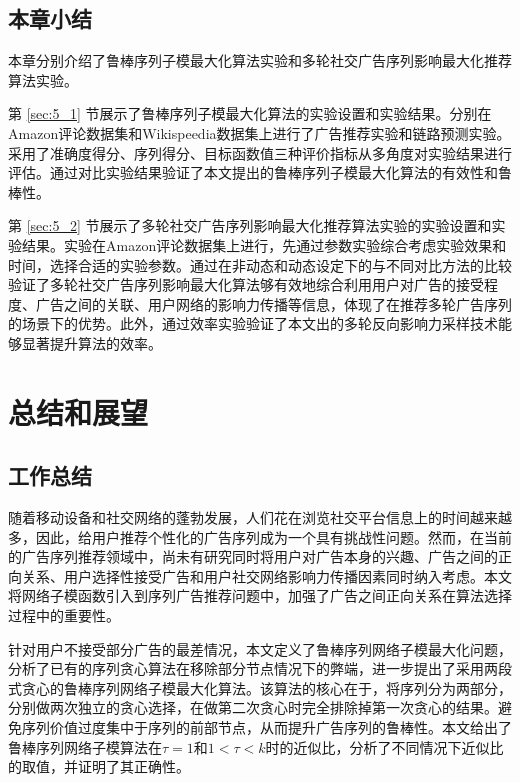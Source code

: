 \section{本章小结}

本章分别介绍了鲁棒序列子模最大化算法实验和多轮社交广告序列影响最大化推荐算法实验。

第 \ref{sec:5_1} 节展示了鲁棒序列子模最大化算法的实验设置和实验结果。分别在Amazon评论数据集和Wikispeedia数据集上进行了广告推荐实验和链路预测实验。采用了准确度得分、序列得分、目标函数值三种评价指标从多角度对实验结果进行评估。通过对比实验结果验证了本文提出的鲁棒序列子模最大化算法的有效性和鲁棒性。

第 \ref{sec:5_2} 节展示了多轮社交广告序列影响最大化推荐算法实验的实验设置和实验结果。实验在Amazon评论数据集上进行，先通过参数实验综合考虑实验效果和时间，选择合适的实验参数。通过在非动态和动态设定下的与不同对比方法的比较验证了多轮社交广告序列影响最大化算法够有效地综合利用用户对广告的接受程度、广告之间的关联、用户网络的影响力传播等信息，体现了在推荐多轮广告序列的场景下的优势。此外，通过效率实验验证了本文出的多轮反向影响力采样技术能够显著提升算法的效率。

\chapter{总结和展望}

\section{工作总结}

随着移动设备和社交网络的蓬勃发展，人们花在浏览社交平台信息上的时间越来越多，因此，给用户推荐个性化的广告序列成为一个具有挑战性问题。然而，在当前的广告序列推荐领域中，尚未有研究同时将用户对广告本身的兴趣、广告之间的正向关系、用户选择性接受广告和用户社交网络影响力传播因素同时纳入考虑。本文将网络子模函数引入到序列广告推荐问题中，加强了广告之间正向关系在算法选择过程中的重要性。

针对用户不接受部分广告的最差情况，本文定义了鲁棒序列网络子模最大化问题，分析了已有的序列贪心算法在移除部分节点情况下的弊端，进一步提出了采用两段式贪心的鲁棒序列网络子模最大化算法。该算法的核心在于，将序列分为两部分，分别做两次独立的贪心选择，在做第二次贪心时完全排除掉第一次贪心的结果。避免序列价值过度集中于序列的前部节点，从而提升广告序列的鲁棒性。本文给出了鲁棒序列网络子模算法在$\tau = 1$和$1 < \tau < k$时的近似比，分析了不同情况下近似比的取值，并证明了其正确性。

